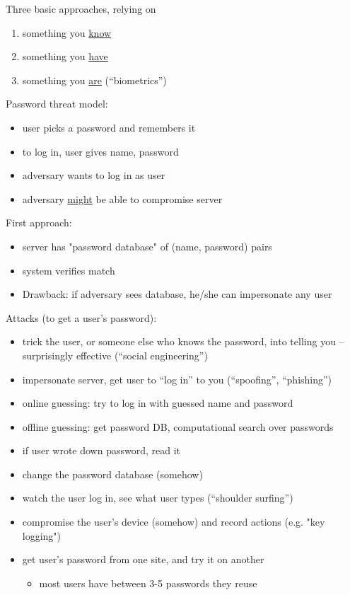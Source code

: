 Three basic approaches, relying on
\begin{enumerate}
    \item something you \underline{know}
    \item something you \underline{have}
    \item something you \underline{are} (``biometrics'')
\end{enumerate}
Password threat model:
\begin{itemize}
    \item user picks a password and remembers it
    \item to log in, user gives name, password
    \item adversary wants to log in as user
    \item adversary \underline{might} be able to compromise server
\end{itemize}
First approach:
\begin{itemize}
    \item server has "password database" of (name, password) pairs
    \item system verifies match
    \item Drawback: if adversary sees database, he/she can impersonate any user
\end{itemize}
Attacks (to get a user's password):
\begin{itemize}
    \item trick the user, or someone else who knows the password, into telling you -- surprisingly effective (``social
            engineering'')
    \item impersonate server, get user to ``log in'' to you (``spoofing'',
            ``phishing'')
    \item online guessing: try to log in with guessed name and password
    \item offline guessing: get password DB, computational search over passwords
    \item if user wrote down password, read it
    \item change the password database (somehow)
    \item watch the user log in, see what user types (``shoulder surfing'')
    \item compromise the user's device (somehow) and record actions (e.g. "key logging")
    \item get user's password from one site, and try it on another
    	\begin{itemize}
		\item most users have between 3-5 passwords they reuse
	\end{itemize}
\end{itemize}
